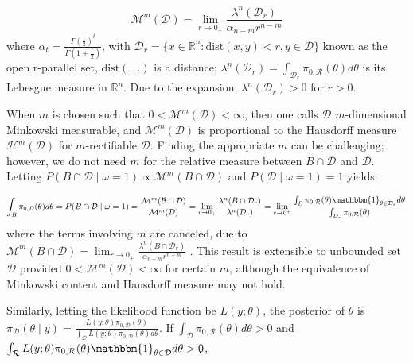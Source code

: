\documentclass[10pt]{article}
\newcommand{\mc}[1]{\mathcal{#1}}
\DeclareMathOperator{\1}{\mathbbm{1}}
\begin{document}
\begin{equation}
\label{minkowski}
	\mc M^m(\mc D)=\lim_{r\rightarrow 0_+}\frac{\lambda^n(\mc D_r)}{\alpha_{n-m} r^{n-m}}
\end{equation}
where $\alpha_t=\frac{\Gamma(\frac{1}{2})^{t}}{\Gamma(1+ \frac{t}{2})}$, with $\mc D_r=\{x\in \mathbb{R}^n: \text{dist}(x,y)<r, y\in \mc D\}$ known as the open r-parallel set, $\text{dist}(.,.)$ is a distance; $\lambda^n(\mc D_r)={ \int_{\mc D_r} \pi_{0,\mc R}(\theta)}d\theta$ is its Lebesgue measure in $\mathbb{R}^n$. Due to the expansion, $\lambda^n(\mc D_r)>0$ for $r>0$.


When $m$ is chosen such that $0<\mc M^m(\mc D)<\infty$, then one calls $\mc D$ $m$-dimensional Minkowski measurable, and $\mc M^m(\mc D)$ is proportional to the Hausdorff measure $\mc H^{m}(\mc D)$ for $m$-rectifiable $\mc D$. Finding the appropriate $m$ can be challenging; however, we do not need $m$ for the relative measure between $B\cap  \mc D$ and $\mc D$.
Letting $P({B\cap  \mc D} \mid \omega=1)\propto \mc M^m(B\cap\mc D)$ and $P({\mc D} \mid \omega=1)=1$ yields:

\begin{equation}
\label{exact_prior2}
	\int_{B} \pi_{0,\mc D}(\theta) d\theta= P({B\cap  \mc D} \mid \omega=1)= \frac{\mc M^m(\mc B\cap \mc D)}{\mc M^m(\mc D)}= \lim_{r\rightarrow 0_+}\frac{\lambda^n(B\cap \mc D_r)}{\lambda^n(\mc D_r)} 
=\lim_{r\rightarrow 0^+} \frac{\int_{ B} \pi_{0,\mc R}(\theta) \mathbbm{1}_{\theta\in \mc D_r} d\theta}{ \int_{\mc D_r} \pi_{0,\mc R}(\theta)}
\end{equation}
where the terms involving $m$ are canceled, due to $\mc M^m(B\cap\mc D)=\lim_{r\rightarrow 0_+}\frac{\lambda^n(B\cap \mc D_r)}{\alpha_{n-m} r^{n-m}}$ \citep{winter2016localization}. This result is extensible to unbounded set $\mc D$ provided $0<\mc M^m(\mc D)<\infty$ for certain $m$, although the equivalence of Minkowski content and Hausdorff measure may not hold.

Similarly, letting the likelihood function be $L(y;\theta)$, the posterior of $\theta$ is $\pi_{\mc D}(\theta \mid y)=\frac{ L(y;\theta) \pi_{0,\mc D}(\theta)}{{\int_\mc D}L(y;\theta) \pi_{0,\mc D}(\theta)d\theta}$. If $\int_{\mc D} \pi_{0,\mc R}(\theta)d\theta >0$ and $\int_{\mc R} L(y;\theta)\pi_{0,\mc R}(\theta) \mathbbm{1}_{\theta\in \mc D}d\theta >0$,
\end{document}
